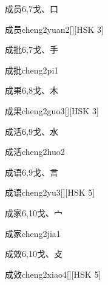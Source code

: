 \begin{entry}{成员}{6,7}{⼽、⼝}
  \begin{phonetics}{成员}{cheng2yuan2}[][HSK 3]
  \end{phonetics}
\end{entry}

\begin{entry}{成批}{6,7}{⼽、⼿}
  \begin{phonetics}{成批}{cheng2pi1}
  \end{phonetics}
\end{entry}

\begin{entry}{成果}{6,8}{⼽、⽊}
  \begin{phonetics}{成果}{cheng2guo3}[][HSK 3]
  \end{phonetics}
\end{entry}

\begin{entry}{成活}{6,9}{⼽、⽔}
  \begin{phonetics}{成活}{cheng2huo2}
  \end{phonetics}
\end{entry}

\begin{entry}{成语}{6,9}{⼽、⾔}
  \begin{phonetics}{成语}{cheng2yu3}[][HSK 5]
  \end{phonetics}
\end{entry}

\begin{entry}{成家}{6,10}{⼽、⼧}
  \begin{phonetics}{成家}{cheng2jia1}
  \end{phonetics}
\end{entry}

\begin{entry}{成效}{6,10}{⼽、⽁}
  \begin{phonetics}{成效}{cheng2xiao4}[][HSK 5]
  \end{phonetics}
\end{entry}


